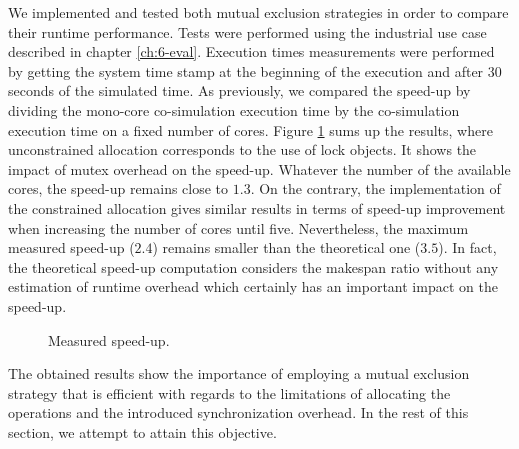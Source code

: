 We implemented and tested both mutual exclusion strategies in order to compare their runtime performance. Tests were performed using the industrial use case described in chapter \ref{ch:6-eval}. Execution times measurements were performed by getting the system time stamp at the beginning of the execution and after $30$ seconds of the simulated time. As previously, we compared the speed-up by dividing the mono-core co-simulation execution time by the co-simulation execution time on a fixed number of cores. Figure \ref{fig:real-speedup} sums up the results, where unconstrained allocation corresponds to the use of lock objects. It shows the impact of mutex overhead on the speed-up. Whatever the number of the available cores, the speed-up remains close to $1.3$. On the contrary, the implementation of the constrained allocation gives similar results in terms of speed-up improvement when increasing the number of cores until five. Nevertheless, the maximum measured speed-up ($2.4$) remains smaller than the theoretical one ($3.5$). In fact, the theoretical speed-up computation considers the makespan ratio without any estimation of runtime overhead which certainly has an important impact on the speed-up.


\begin{figure}[phbt]
\centering
{}
\caption{Measured speed-up.}
\label{fig:real-speedup}
\end{figure}

The obtained results show the importance of employing a mutual exclusion strategy that is efficient with regards to the limitations of allocating the operations and the introduced synchronization overhead. In the rest of this section, we attempt to attain this objective.

